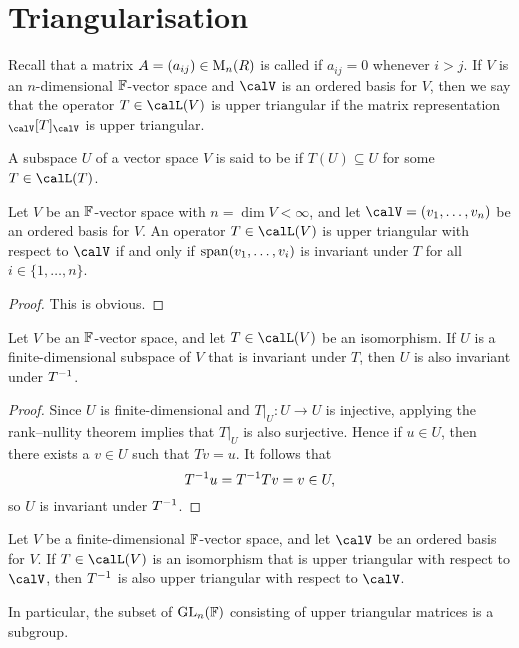 \chapter{Triangularisation}

Recall that a matrix $A = (a_{ij}) \in \mathrm{M}_{n}(R)$ is called  if $a_{ij} = 0$ whenever $i > j$. If $V$ is an $n$-dimensional $\mathbb{F}$-vector space and $\calV$ is an ordered basis for $V$, then we say that the operator $T \in \lin(V)$ is upper triangular  if the matrix representation $\mr{\calV}{T}{\calV}$ is upper triangular.

A subspace $U$ of a vector space $V$ is said to be  if $T(U) \subseteq U$ for some $T \in \lin(T)$.

\begin{proposition}
    \label{prop:upper-triangular-criterion}
    Let $V$ be an $\mathbb{F}$-vector space with $n = \dim V < \infty$, and let $\calV = (v_1, \ldots, v_n)$ be an ordered basis for $V$. An operator $T \in \lin(V)$ is upper triangular with respect to $\calV$ if and only if $\operatorname{span}(v_1, \ldots, v_i)$ is invariant under $T$ for all $i \in \{1, \ldots, n\}$.
\end{proposition}

\begin{proof}
    This is obvious.
\end{proof}


\begin{lemma}
    Let $V$ be an $\mathbb{F}$-vector space, and let $T \in \lin(V)$ be an isomorphism. If $U$ is a finite-dimensional subspace of $V$ that is invariant under $T$, then $U$ is also invariant under $T^{-1}$.
\end{lemma}

\begin{proof}
    Since $U$ is finite-dimensional and $T|_U \colon U \to U$ is injective, applying the rank--nullity theorem implies that $T|_U$ is also surjective. Hence if $u \in U$, then there exists a $v \in U$ such that $Tv = u$. It follows that
    \begin{equation*}
        T^{-1} u
            = T^{-1} Tv
            = v
            \in U,
    \end{equation*}
    so $U$ is invariant under $T^{-1}$.
\end{proof}


\begin{proposition}
    Let $V$ be a finite-dimensional $\mathbb{F}$-vector space, and let $\calV$ be an ordered basis for $V$. If $T \in \lin(V)$ is an isomorphism that is upper triangular with respect to $\calV$, then $T^{-1}$ is also upper triangular with respect to $\calV$.

    In particular, the subset of $\mathrm{GL}_{n}(\mathbb{F})$ consisting of upper triangular matrices is a subgroup.
\end{proposition}

